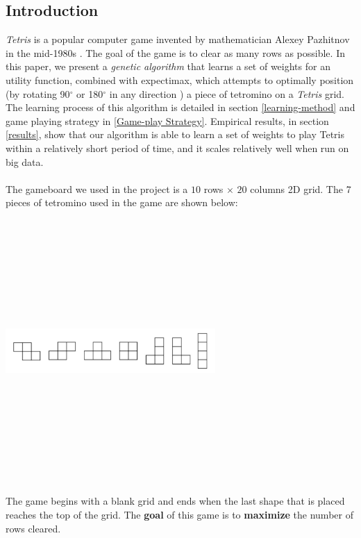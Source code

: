 \documentclass{article} %
\begin{document}
\begin{multicols}{2}
\section{Introduction} \label{intro}
\textsl{Tetris} is a popular computer game invented by mathematician Alexey Pazhitnov in the mid-1980s \cite{Tetris}. The goal of the game is to clear as many rows as possible. In this paper, we present a \textsl{genetic algorithm} that learns a set of weights for an utility function, combined with expectimax, which attempts to optimally position (by rotating 90$^\circ$ or 180$^\circ$ in any direction ) a piece of tetromino on a \textsl{Tetris} grid. The learning process of this algorithm is detailed in section \ref{learning-method} and game playing strategy in \ref{Game-play Strategy}. Empirical results, in section \ref{results}, show that our algorithm is able to learn a set of weights to play Tetris within a relatively short period of time, and it scales relatively well when run on big data.\\ \\
\noindent
The gameboard we used in the project is a $10$ rows $\times$ $20$ columns 2D grid. The 7 pieces of tetromino used in the game are shown below:

\begin{center}
\includegraphics[width=8cm,height=10cm,keepaspectratio]{tetris_shapes.JPG}
\end{center}

\noindent
The game begins with a blank grid and ends when the last shape that is placed reaches the top of the grid. The \textbf{goal} of this game is to \textbf{maximize} the number of rows cleared.


\end{multicols}
\end{document}
